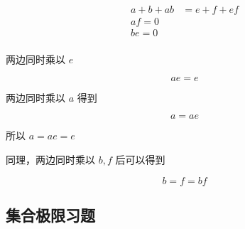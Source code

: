 \documentclass[12pt,a4paper]{ctexart}
\begin{document}
\begin{enumerate}
    \begin{align*}
        a + b + ab &= e + f + ef \\
        af = 0 \\
        be = 0 \\
    \end{align*}

    两边同时乘以 $e$

    \[
    ae = e
    \]

    两边同时乘以 $a$ 得到

    \[
        a = ae 
    \]

    所以 $a = ae = e$

    同理，两边同时乘以 $b,f$ 后可以得到

    \[
        b = f = bf
    \]
\end{enumerate}

\subsection{集合极限习题}
\end{document}

